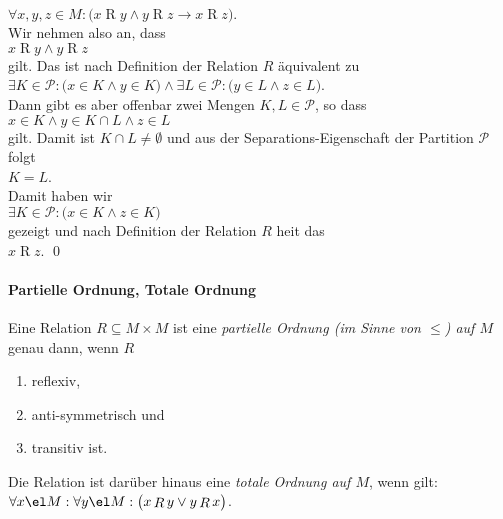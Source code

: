 \begin{enumerate}
      \\[0.2cm]
      \hspace*{1.3cm}
      $\forall x,y,z \in M:\bigl( x \mathop{R} y \wedge y \mathop{R} z \rightarrow x \mathop{R} z\bigr)$.
      \\[0.2cm]
      Wir nehmen also an, dass 
      \\[0.2cm]
      \hspace*{1.3cm}
      $x \mathop{R} y \wedge y \mathop{R} z$
      \\[0.2cm]
      gilt.  Das ist nach Definition der Relation $R$ \"{a}quivalent zu
      \\[0.2cm]
      \hspace*{1.3cm}
      $\exists K \in \mathcal{P}: \bigl(x \in K \wedge y \in K\bigr) \wedge 
       \exists L \in \mathcal{P}: \bigl(y \in L \wedge z \in L\bigr)$.
      \\[0.2cm]
      Dann gibt es aber offenbar zwei Mengen $K,L\in\mathcal{P}$, so dass
      \\[0.2cm]
      \hspace*{1.3cm}
      $x \in K \wedge y \in K \cap L \wedge z \in L$
      \\[0.2cm]
      gilt.  Damit ist $K \cap L \not= \emptyset$ und aus der 
      Separations-Eigenschaft der Partition $\mathcal{P}$ folgt 
      \\[0.2cm]
      \hspace*{1.3cm}
      $K = L$.
      \\[0.2cm]
      Damit haben wir 
      \\[0.2cm]
      \hspace*{1.3cm}
      $\exists K \in \mathcal{P}: \bigl(x \in K \wedge z \in K\bigr)$
      \\[0.2cm]
      gezeigt und nach Definition der Relation $R$ hei\3t das 
      \\[0.2cm]
      \hspace*{1.3cm}
      $x \mathop{R} z$. 
      \qed
\end{enumerate}

\paragraph{Partielle Ordnung, Totale Ordnung}  \hspace*{\fill} \linebreak
Eine Relation $R \subseteq M \times M$  ist eine 
\emph{partielle Ordnung (im Sinne von $\leq$) auf $M$} genau dann, wenn $R$
\begin{enumerate}
\item reflexiv,
\item anti-symmetrisch und
\item transitiv ist.
\end{enumerate}
Die Relation ist dar\"{u}ber hinaus eine \emph{totale Ordnung auf $M$}, wenn gilt:
\\[0.2cm]
\hspace*{1.3cm} $\forall x \el M : \forall y \el M :\bigl( x\mathop{R}y \vee y \mathop{R} x\bigr)$.

